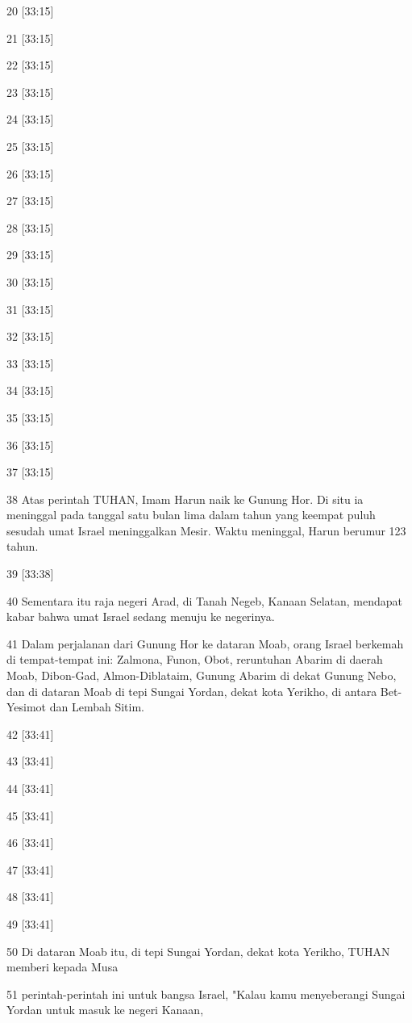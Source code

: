 \par 20 [33:15]
\par 21 [33:15]
\par 22 [33:15]
\par 23 [33:15]
\par 24 [33:15]
\par 25 [33:15]
\par 26 [33:15]
\par 27 [33:15]
\par 28 [33:15]
\par 29 [33:15]
\par 30 [33:15]
\par 31 [33:15]
\par 32 [33:15]
\par 33 [33:15]
\par 34 [33:15]
\par 35 [33:15]
\par 36 [33:15]
\par 37 [33:15]
\par 38 Atas perintah TUHAN, Imam Harun naik ke Gunung Hor. Di situ ia meninggal pada tanggal satu bulan lima dalam tahun yang keempat puluh sesudah umat Israel meninggalkan Mesir. Waktu meninggal, Harun berumur 123 tahun.
\par 39 [33:38]
\par 40 Sementara itu raja negeri Arad, di Tanah Negeb, Kanaan Selatan, mendapat kabar bahwa umat Israel sedang menuju ke negerinya.
\par 41 Dalam perjalanan dari Gunung Hor ke dataran Moab, orang Israel berkemah di tempat-tempat ini: Zalmona, Funon, Obot, reruntuhan Abarim di daerah Moab, Dibon-Gad, Almon-Diblataim, Gunung Abarim di dekat Gunung Nebo, dan di dataran Moab di tepi Sungai Yordan, dekat kota Yerikho, di antara Bet-Yesimot dan Lembah Sitim.
\par 42 [33:41]
\par 43 [33:41]
\par 44 [33:41]
\par 45 [33:41]
\par 46 [33:41]
\par 47 [33:41]
\par 48 [33:41]
\par 49 [33:41]
\par 50 Di dataran Moab itu, di tepi Sungai Yordan, dekat kota Yerikho, TUHAN memberi kepada Musa
\par 51 perintah-perintah ini untuk bangsa Israel, "Kalau kamu menyeberangi Sungai Yordan untuk masuk ke negeri Kanaan,
